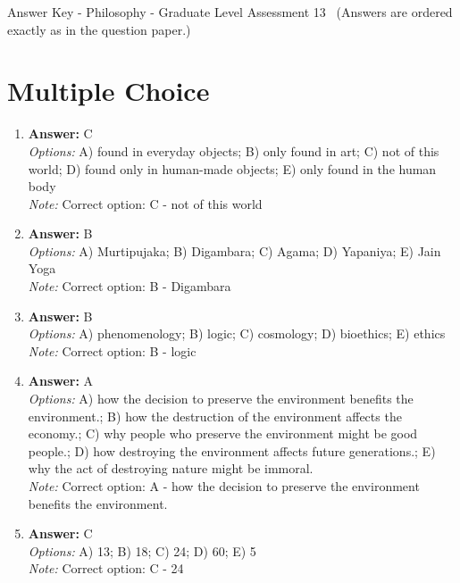 \documentclass[12pt]{article}
\begin{document}
\begin{center}
Answer Key - Philosophy - Graduate Level Assessment 13 \
\small (Answers are ordered exactly as in the question paper.)
\end{center}

\section*{Multiple Choice}
\begin{enumerate}[label=\arabic*.]
\item \textbf{Answer:} C
\\ \textit{Options:} A) found in everyday objects; B) only found in art; C) not of this world; D) found only in human-made objects; E) only found in the human body
\\ \textit{Note:} Correct option: C - not of this world
\item \textbf{Answer:} B
\\ \textit{Options:} A) Murtipujaka; B) Digambara; C) Agama; D) Yapaniya; E) Jain Yoga
\\ \textit{Note:} Correct option: B - Digambara
\item \textbf{Answer:} B
\\ \textit{Options:} A) phenomenology; B) logic; C) cosmology; D) bioethics; E) ethics
\\ \textit{Note:} Correct option: B - logic
\item \textbf{Answer:} A
\\ \textit{Options:} A) how the decision to preserve the environment benefits the environment.; B) how the destruction of the environment affects the economy.; C) why people who preserve the environment might be good people.; D) how destroying the environment affects future generations.; E) why the act of destroying nature might be immoral.
\\ \textit{Note:} Correct option: A - how the decision to preserve the environment benefits the environment.
\item \textbf{Answer:} C
\\ \textit{Options:} A) 13; B) 18; C) 24; D) 60; E) 5
\\ \textit{Note:} Correct option: C - 24
\end{enumerate}
\end{document}
